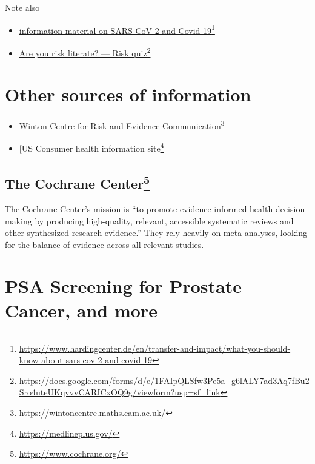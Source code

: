 \documentclass[
  10pt,
  b5paper]{book}
\providecommand{\tightlist}{%
  \setlength{\itemsep}{0pt}\setlength{\parskip}{0pt}}
\begin{document}
Note also

\begin{itemize}
\tightlist
\item
  \href{https://www.hardingcenter.de/en/transfer-and-impact/what-you-should-know-about-sars-cov-2-and-covid-19}{information material on SARS-CoV-2 and Covid-19}\footnote{\url{https://www.hardingcenter.de/en/transfer-and-impact/what-you-should-know-about-sars-cov-2-and-covid-19}}
\item
  \href{https://docs.google.com/forms/d/e/1FAIpQLSfw3Pe5a_g6lALY7ad3Aq7fBu2Sro4uteUKqvvvCARICxOQ9g/viewform?usp=sf_link}{Are you risk literate? --- Risk quiz}\footnote{\url{https://docs.google.com/forms/d/e/1FAIpQLSfw3Pe5a_g6lALY7ad3Aq7fBu2Sro4uteUKqvvvCARICxOQ9g/viewform?usp=sf_link}}
\end{itemize}

\hypertarget{other-sources-of-information}{%
\section{Other sources of information}\label{other-sources-of-information}}

\begin{itemize}
\tightlist
\item
  Winton Centre for Risk and Evidence Communication\footnote{\url{https://wintoncentre.maths.cam.ac.uk/}}
\item
  {[}US Consumer health information site\footnote{\url{https://medlineplus.gov/}}
\end{itemize}

\hypertarget{the-cochrane-center}{%
\subsection*{\texorpdfstring{The Cochrane Center\footnote{\url{https://www.cochrane.org/}}}{The Cochrane Center}}\label{the-cochrane-center}}

The Cochrane Center's mission is ``to promote evidence-informed health decision-making by producing high-quality, relevant, accessible systematic
reviews and other synthesized research evidence.'' They rely heavily on
meta-analyses, looking for the balance of evidence across all relevant
studies.

\hypertarget{psa-screening-for-prostate-cancer-and-more}{%
\section{PSA Screening for Prostate Cancer, and more}\label{psa-screening-for-prostate-cancer-and-more}}
\end{document}
